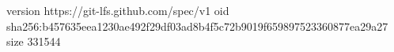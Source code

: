 version https://git-lfs.github.com/spec/v1
oid sha256:b457635eea1230ae492f29df03ad8b4f5c72b9019f659897523360877ea29a27
size 331544
